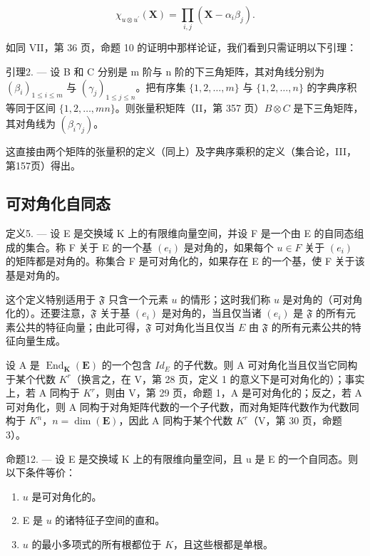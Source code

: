 \[
\chi_ {u \otimes u ^ {\prime}} (\mathbf {X}) = \prod_ {i, j} \left(\mathbf {X} - \alpha_ {i} \beta_ {j}\right).
\]

如同 VII，第 36 页，命题 10 的证明中那样论证，我们看到只需证明以下引理：

引理2. --- 设 B 和 C 分别是 m 阶与 n 阶的下三角矩阵，其对角线分别为 \((\beta_{i})_{1\leq i\leq m}\) 与 \((\gamma_{j})_{1\leq j\leq n}\)。把有序集 \(\{1,2,\ldots,m\}\) 与 \(\{1,2,\ldots,n\}\) 的字典序积等同于区间 \(\{1,2,\ldots,mn\}\)。则张量积矩阵（II，第 357 页）\(B\otimes C\) 是下三角矩阵，其对角线为 \((\beta_{i}\gamma_{j})\)。

这直接由两个矩阵的张量积的定义（同上）及字典序乘积的定义（集合论，III，第157页）得出。

\subsection{可对角化自同态}

定义5. --- 设 E 是交换域 K 上的有限维向量空间，并设 F 是一个由 E 的自同态组成的集合。称 F 关于 E 的一个基 \((e_{i})\) 是对角的，如果每个 \(u \in F\) 关于 \((e_{i})\) 的矩阵都是对角的。称集合 F 是可对角化的，如果存在 E 的一个基，使 F 关于该基是对角的。

这个定义特别适用于 \(\mathfrak{F}\) 只含一个元素 \(u\) 的情形；这时我们称 \(u\) 是对角的（可对角化的）。还要注意，\(\mathfrak{F}\) 关于基 \((e_i)\) 是对角的，当且仅当诸 \((e_i)\) 是 \(\mathfrak{F}\) 的所有元素公共的特征向量；由此可得，\(\mathfrak{F}\) 可对角化当且仅当 \(E\) 由 \(\mathfrak{F}\) 的所有元素公共的特征向量生成。

设 A 是 \(\operatorname{End}_{\mathbf{K}}(\mathbf{E})\) 的一个包含 \(Id_{E}\) 的子代数。则 A 可对角化当且仅当它同构于某个代数 \(K^{r}\)（换言之，在 V，第 28 页，定义 1 的意义下是可对角化的）；事实上，若 A 同构于 \(K^{r}\)，则由 V，第 29 页，命题 1，A 是可对角化的；反之，若 A 可对角化，则 A 同构于对角矩阵代数的一个子代数，而对角矩阵代数作为代数同构于 \(K^{n}\)，\(n = \dim(\mathbf{E})\)，因此 A 同构于某个代数 \(K^{r}\)（V，第 30 页，命题 3）。

命题12. --- 设 E 是交换域 K 上的有限维向量空间，且 u 是 E 的一个自同态。则以下条件等价：

\begin{enumerate}
\def\labelenumi{(\roman{enumi})}
\item
  \(u\) 是可对角化的。
\item
  E 是 \(u\) 的诸特征子空间的直和。
\item
  \(u\) 的最小多项式的所有根都位于 \(K\)，且这些根都是单根。
\end{enumerate}

